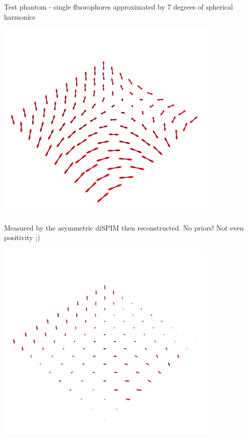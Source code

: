 \documentclass[presentation]{beamer}
\begin{document}
\begin{frame}{Test phantom - single fluorophores approximated by 7 degrees of spherical harmonics}
\begin{center}
  \includegraphics[width=0.8\textwidth, interpolate=true, trim={0 0 0 12cm}]{figs/tp_test.png}
\end{center}
\end{frame}

\begin{frame}{Measured by the asymmetric diSPIM then reconstructed. No priors! Not even positivity ;)}
\begin{center}
  \includegraphics[width=0.8\textwidth, interpolate=true, trim={0 0 0 12cm}]{figs/recon_test.png}
\end{center}
\end{frame}
\end{document}
